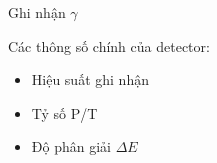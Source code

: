 \begin{frame}[label = ghinhan]{Ghi nhận $\gamma$}

Các thông số chính của detector:

\begin{itemize}
	\item <2-4>Hiệu suất ghi nhận
	\item <3-4>Tỷ số P/T
	\item <4-4>Độ phân giải $\Delta E$
\end{itemize}


\end{frame}